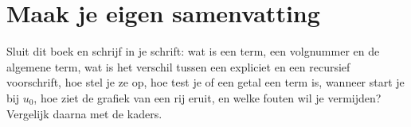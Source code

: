 
\begin{oefeningen}








\end{oefeningen}


\ifzelfstudie
\section*{Maak je eigen samenvatting}
Sluit dit boek en schrijf in je schrift: wat is een term, een volgnummer en de algemene term, wat is het verschil tussen een expliciet en een recursief voorschrift, hoe stel je ze op, hoe test je of een getal een term is, wanneer start je bij $u_0$, hoe ziet de grafiek van een rij eruit, en welke fouten wil je vermijden? Vergelijk daarna met de kaders.
\fi
